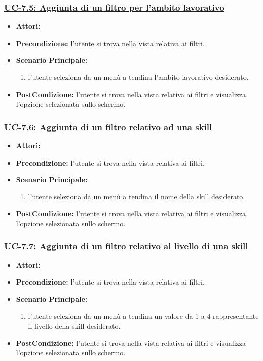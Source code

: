 \subsubsection{\underline{UC-7.5: Aggiunta di un filtro per l'ambito lavorativo}}
\begin{itemize}
	\item \textbf{Attori:}\loggedusr
	\item \textbf{Precondizione:} l'utente si trova nella vista relativa ai filtri.
	\item \textbf{Scenario Principale:}
	\begin{enumerate}
		\item l'utente seleziona da un menù a tendina l'ambito lavorativo desiderato.
	\end{enumerate}
	\item \textbf{PostCondizione:}  l'utente si trova nella vista relativa ai filtri e visualizza l'opzione selezionata sullo schermo.
\end{itemize}

\subsubsection{\underline{UC-7.6: Aggiunta di un filtro relativo ad una skill }}
\begin{itemize}
	\item \textbf{Attori:}\loggedusr
	\item \textbf{Precondizione:} l'utente si trova nella vista relativa ai filtri.
	\item \textbf{Scenario Principale:}
	\begin{enumerate}
		\item l'utente seleziona da un menù a tendina il nome della skill desiderato.
	\end{enumerate}
	\item \textbf{PostCondizione:}  l'utente si trova nella vista relativa ai filtri e visualizza l'opzione selezionata sullo schermo.
\end{itemize}

\subsubsection{\underline{UC-7.7: Aggiunta di un filtro relativo al livello di una skill}}
\begin{itemize}
	\item \textbf{Attori:}\loggedusr
	\item \textbf{Precondizione:} l'utente si trova nella vista relativa ai filtri.
	\item \textbf{Scenario Principale:}
	\begin{enumerate}
		\item l'utente seleziona da un menù a tendina un valore da 1 a 4 rappresentante il livello della skill desiderato.
	\end{enumerate}
	\item \textbf{PostCondizione:}  l'utente si trova nella vista relativa ai filtri e visualizza l'opzione selezionata sullo schermo.
\end{itemize}

